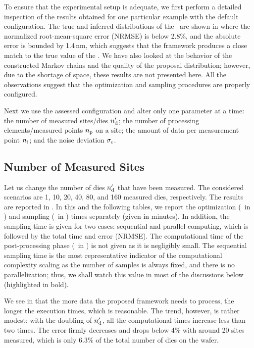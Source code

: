 To ensure that the experimental setup is adequate, we first perform a detailed inspection of the results obtained for one particular example with the default configuration.
The true and inferred distributions of the \qoi\ are shown in  where the normalized root-mean-square error (NRMSE) is below 2.8\%, and the absolute error is bounded by 1.4$\,$nm, which suggests that the framework produces a close match to the true value of the \qoi.
We have also looked at the behavior of the constructed Markov chains and the quality of the proposal distribution; however, due to the shortage of space, these results are not presented here.
All the observations suggest that the optimization and sampling procedures are properly configured.

Next we use the assessed configuration and alter only one parameter at a time: the number of measured sites/dies ${n_\text{d}'}$; the number of processing elements/measured points ${n_\text{p}}$ on a site; the amount of data per measurement point ${n_\text{t}}$; and the noise deviation $\sigma_\epsilon$.

\subsection{Number of Measured Sites}
Let us change the number of dies ${n_\text{d}'}$ that have been measured.
The considered scenarios are 1, 10, 20, 40, 80, and 160 measured dies, respectively.
The results are reported in .
In this and the following tables, we report the optimization (\ in ) and sampling (\ in ) times separately (given in minutes).
In addition, the sampling time is given for two cases: sequential and parallel computing, which is followed by the total time and error (NRMSE).
The computational time of the post-processing phase (\ in ) is not given as it is negligibly small.
The sequential sampling time is the most representative indicator of the computational complexity scaling as the number of samples is always fixed, and there is no parallelization; thus, we shall watch this value in most of the discussions below (highlighted in bold).

We see in  that the more data the proposed framework needs to process, the longer the execution times, which is reasonable.
The trend, however, is rather modest: with the doubling of ${n_\text{d}'}$, all the computational times increase less than two times.
The error firmly decreases and drops below 4\% with around 20 sites measured, which is only 6.3\% of the total number of dies on the wafer.

